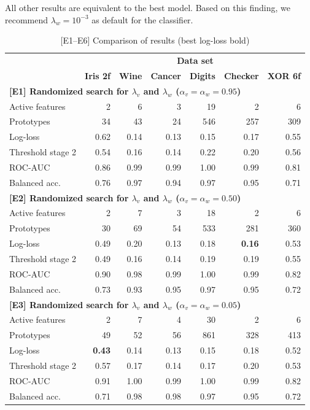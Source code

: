 All other results are equivalent to the best model.
Based on this finding, we recommend $\lambda_w=10^{-3}$ as default for the classifier.\par
%
\begin{table}
\caption{[E1--E6] Comparison of results (best log-loss bold)}
\label{tab_e1_to_e6}
%
\begin{center}
\small
\begin{tabular}{|lrrrrrr|}
\hline
&\multicolumn{6}{c|}{\textbf{\hrulefill\ Data set \hrulefill}}\\
&\textbf{Iris 2f}&\textbf{Wine}&\textbf{Cancer}&\textbf{Digits}&\textbf{Checker}&\textbf{XOR 6f}\\
\multicolumn{7}{|l|}{\textbf{[E1] Randomized search for $\lambda_v$ and $\lambda_w$ ($\alpha_v=\alpha_w=0.95$)}}\\
Active features&2&6&3&19&2&6\\
Prototypes&34&43&24&546&257&309\\
Log-loss&0.62&0.14&0.13&0.15&0.17&0.55\\
Threshold stage 2&0.54&0.16&0.14&0.22&0.20&0.56\\
ROC-AUC&0.86&0.99&0.99&1.00&0.99&0.81\\
Balanced acc.&0.76&0.97&0.94&0.97&0.95&0.71\\
\multicolumn{7}{|l|}{\textbf{[E2] Randomized search for $\lambda_v$ and $\lambda_w$ ($\alpha_v=\alpha_w=0.50$)}}\\
Active features&2&7&3&18&2&6\\
Prototypes&30&69&54&533&281&360\\
Log-loss&0.49&0.20&0.13&0.18&\textbf{0.16}&0.53\\
Threshold stage 2&0.49&0.16&0.14&0.19&0.19&0.55\\
ROC-AUC&0.90&0.98&0.99&1.00&0.99&0.82\\
Balanced acc.&0.73&0.93&0.95&0.97&0.95&0.72\\
\multicolumn{7}{|l|}{\textbf{[E3] Randomized search for $\lambda_v$ and $\lambda_w$ ($\alpha_v=\alpha_w=0.05$)}}\\
Active features&2&7&4&30&2&6\\
Prototypes&49&52&56&861&328&413\\
Log-loss&\textbf{0.43}&0.14&0.13&0.15&0.18&0.52\\
Threshold stage 2&0.57&0.17&0.14&0.17&0.20&0.53\\
ROC-AUC&0.91&1.00&0.99&1.00&0.99&0.82\\
Balanced acc.&0.71&0.98&0.98&0.97&0.95&0.72\\

\end{tabular}
\end{center}
\end{table}
